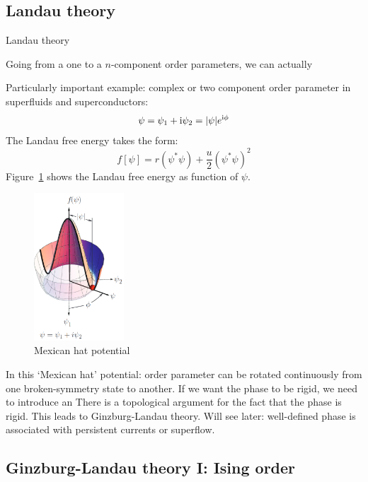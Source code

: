 \documentclass[../main.tex]{subfiles}
\begin{document}
\subsection{Landau theory}

Landau theory

Going from a one to a \(n\)-component order parameters, we can actually

Particularly important example: complex or two component order parameter in superfluids and superconductors:
\begin{equation}
    \psi = \psi_1 + \mathrm{i} \psi_2 = \vert \psi \vert e^{\mathrm{i} \phi}
\end{equation}
The Landau free energy takes the form:
\begin{equation}
    f[\psi] = r(\psi^* \psi) + \frac{u}{2} (\psi^* \psi)^2
\end{equation}
Figure~\ref{fig:Landau free energy mexican hat potential} shows the Landau free energy as function of \(\psi\).

\begin{figure}[t]
    \centering
    \includegraphics[width=0.3\textwidth]{images/landau free energy mexican hat}
    \caption{Mexican hat potential}
    \label{fig:Landau free energy mexican hat potential}
\end{figure}

In this `Mexican hat' potential: order parameter can be rotated continuously from one broken-symmetry state to another.
If we want the phase to be rigid, we need to introduce an
There is a topological argument for the fact that the phase is rigid.
This leads to Ginzburg-Landau theory.
Will see later: well-defined phase is associated with persistent currents or superflow.

\subsection{Ginzburg-Landau theory I: Ising order}
\end{document}
